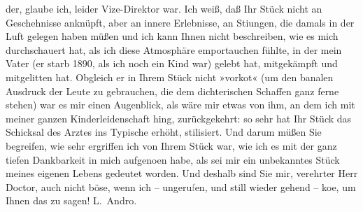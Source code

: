 \begin{ledgroupsized}[t]{13cm}
               der, glaube ich, \introOben{}leider\introOben{} Vize-Direktor war. Ich weiß, daß Ihr
                  Stück nicht an Geschehnisse
               anknüpft, aber an innere Erlebnisse, an Sti{\geminationm}ungen, die
               damals in der Luft gelegen haben müßen und ich kann Ihnen nicht beschreiben, wie es
               mich durchschauert hat, als ich diese Atmosphäre emportauchen fühlte, in der mein Vater (er starb
                  1890, als ich noch ein Kind war) gelebt hat, mitgekämpft und
               mitgelitten hat. Obgleich er in Ihrem Stück nicht »vorko{\geminationm}t« (um den banalen Ausdruck der Leute zu gebrauchen, die dem dichterischen Schaffen
               ganz ferne stehen) war es mir einen Augenblick, als wäre mir etwas von ihm, an dem
               ich mit meiner ganzen Kinderleidenschaft hing, zurückgekehrt: so sehr hat Ihr Stück das Schicksal des Arztes ins
               Typische erhöht, stilisiert. Und darum müßen Sie begreifen, wie sehr ergriffen ich
               von Ihrem Stück war, wie ich {\pb}es mit der ganz tiefen Dankbarkeit in mich aufgeno{\geminationm}en habe, als sei mir ein unbekanntes Stück meines
               eigenen Lebens gedeutet worden. Und deshalb sind Sie mir, verehrter Herr Doctor, auch
               nicht böse, wenn ich – ungeru\textcolor{gray}{f}en, und still wieder gehend – ko{\geminationm}e, um Ihnen das zu sagen!\pend
           \pstart \spacefill\mbox{L. Andro.}\pend{}
         
         \endnumbering{}\end{ledgroupsized}  \newcommand{\dateiname}{L02570}\newcommand{\titel}{Therese Rie-Andro an Arthur Schnitzler, 29. 11. 1912}\newcommand{\editorInnen}{Martin Anton Müller und Gerd-Hermann Susen}
      